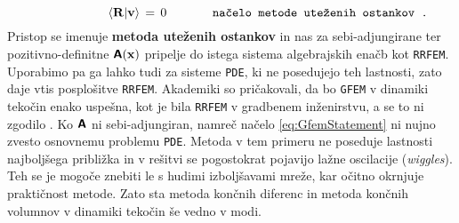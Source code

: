 \begin{equation}
	\hspace{21mm} \bra{\mathbf{R}}\ket{\mathbf{v}} \, = \, 0 \hspace{13mm} \texttt{načelo metode uteženih ostankov .}
	\label{eq:GfemStatement}
\end{equation}
Pristop se imenuje \textbf{metoda uteženih ostankov} in nas za sebi-adjungirane ter pozitivno-definitne $\bm{\mathsf{A}}\mathbf{(x)}$ pripelje do istega sistema algebrajskih enačb kot \texttt{RRFEM}. Uporabimo pa ga lahko tudi za sisteme \texttt{PDE}, ki ne posedujejo teh lastnosti, zato daje vtis posplošitve \texttt{RRFEM}. Akademiki so pričakovali, da bo \texttt{GFEM} v dinamiki tekočin enako uspešna, kot je bila \texttt{RRFEM} v gradbenem inženirstvu, a se to ni zgodilo \cite{JiangB-LSFEM}. Ko $\bm{\mathsf{A}}$ ni sebi-adjungiran, namreč načelo \eqref{eq:GfemStatement} ni nujno zvesto osnovnemu problemu \texttt{PDE}. Metoda v tem primeru ne poseduje lastnosti najboljšega približka in v rešitvi se pogostokrat pojavijo lažne oscilacije (\emph{wiggles}). Teh se je mogoče znebiti le s hudimi izboljšavami mreže, kar očitno okrnjuje praktičnost metode. Zato sta metoda končnih diferenc in metoda končnih volumnov v dinamiki tekočin še vedno v modi.

